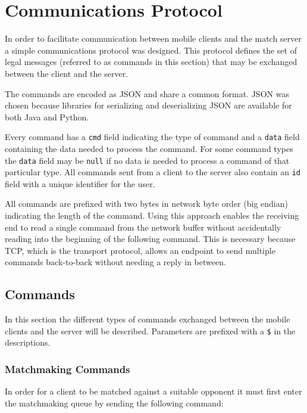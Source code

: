 \section{Communications Protocol}
\label{sec:com_protocol}
In order to facilitate communication between mobile clients and the match server a simple communications protocol was designed.
This protocol defines the set of legal messages (referred to as commands in this section) that may be exchanged between the client and the server.

The commands are encoded as \ac{JSON} and share a common format.
\ac{JSON} was chosen because libraries for serializing and deserializing \ac{JSON} are available for both Java and Python.

Every command has a \texttt{cmd} field indicating the type of command and a \texttt{data} field containing the data needed to process the command.
For some command types the \texttt{data} field may be \texttt{null} if no data is needed to process a command of that particular type.
All commands sent from a client to the server also contain an \texttt{id} field with a unique identifier for the user.

All commands are prefixed with two bytes in network byte order (big endian) indicating the length of the command.
Using this approach enables the receiving end to read a single command from the network buffer without accidentally reading into the beginning of the following command.
This is necessary because \ac{TCP}, which is the transport protocol, allows an endpoint to send multiple commands back-to-back without needing a reply in between.

\subsection{Commands}
In this section the different types of commands exchanged between the mobile clients and the server will be described.
Parameters are prefixed with a \texttt{\$} in the descriptions.

\subsubsection{Matchmaking Commands}
In order for a client to be matched against a suitable opponent it must first enter the matchmaking queue by sending the following command:

